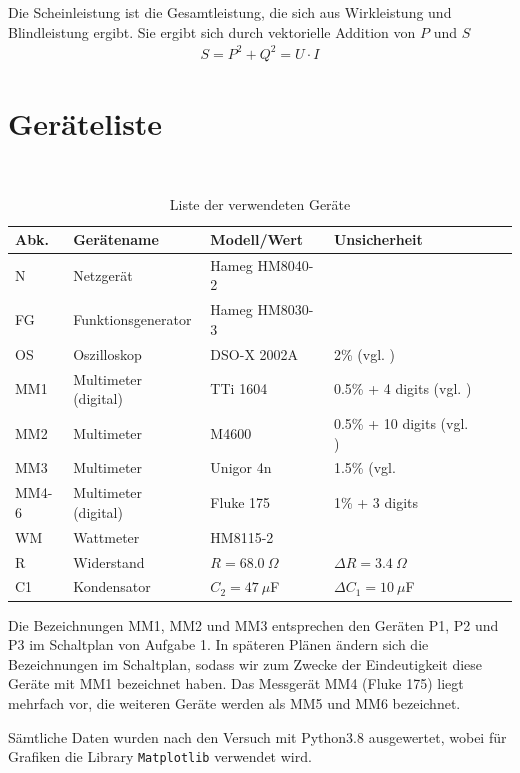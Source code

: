 \documentclass{article}
\begin{document}
Die Scheinleistung ist die Gesamtleistung, die sich aus Wirkleistung und Blindleistung ergibt. Sie ergibt sich durch vektorielle Addition von $P$ und $S$
\begin{align}
S = P^2 + Q^2 = U\cdot I 
\end{align}




\section{Geräteliste}

\begin{table}[H]
\caption{Liste der verwendeten Geräte}

~

\begin{tabular}{l|p{2.3cm}p{3cm}lll}
Abk. & Gerätename    &  Modell/Wert  & Unsicherheit\\
\hline
N & Netzgerät & Hameg HM8040-2 \\
FG & Funktions\-generator & Hameg HM8030-3 \\
OS & Oszilloskop & DSO-X 2002A  & 2\% (vgl. \cite{oszi_datenblatt}) \\
MM1 & Multimeter (digital) & TTi 1604 & 0.5\% + 4 digits (vgl. \cite{moodle})\\
MM2 & Multimeter & M4600 & 0.5\% + 10 digits (vgl. \cite{moodle}) \\
MM3 & Multimeter & Unigor 4n & 1.5\% (vgl. \cite{moodle} \\
MM4-6 & Multimeter (digital) & Fluke 175 & 1\% + 3 digits \\
WM & Wattmeter & HM8115-2 \\
R & Widerstand & $R=68.0~\Omega$ & $\Delta R = 3.4~\Omega$ \\
C1 & Kondensator & $C_2=47~\mu$F & $\Delta C_1 = 10~\mu$F \\
\end{tabular}
\end{table}

Die Bezeichnungen MM1, MM2 und MM3 entsprechen den Geräten P1, P2 und P3 im Schaltplan von Aufgabe 1. In späteren Plänen ändern sich die Bezeichnungen im Schaltplan, sodass wir zum Zwecke der Eindeutigkeit diese Geräte mit MM1 bezeichnet haben. Das Messgerät MM4 (Fluke 175) liegt mehrfach vor, die weiteren Geräte werden als MM5 und MM6 bezeichnet.

Sämtliche Daten wurden nach den Versuch mit Python3.8 ausgewertet, wobei für Grafiken die Library \texttt{Matplotlib} verwendet wird. 
\end{document}
